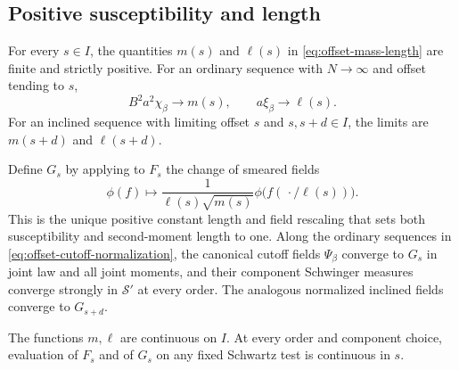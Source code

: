 \subsection{Positive susceptibility and length}

\begin{proposition}
\label{prop:normalization}
For every $s\in I$, the quantities $m(s)$ and $\ell(s)$ in
\eqref{eq:offset-mass-length} are finite and strictly positive.
For an ordinary sequence with $N\to\infty$ and offset tending to $s$,
\begin{equation}
 B^2a^2\chi_\beta\longrightarrow m(s),\qquad
 a\xi_\beta\longrightarrow\ell(s).
 \label{eq:offset-cutoff-normalization}
\end{equation}
For an inclined sequence with limiting offset $s$ and $s,s+d\in I$,
the limits are $m(s+d)$ and $\ell(s+d)$.

Define $G_s$ by applying to $F_s$ the change of smeared fields
\begin{equation}
 \phi(f)\longmapsto\frac{1}{\ell(s)\sqrt{m(s)}}
                     \phi\bigl(f(\,\cdot/\ell(s))\bigr).
 \label{eq:canonical-hierarchy-normalization}
\end{equation}
This is the unique positive constant length and field rescaling that
sets both susceptibility and second-moment length to one.
Along the ordinary sequences in
\eqref{eq:offset-cutoff-normalization}, the canonical cutoff fields
$\Psi_\beta$ converge to $G_s$ in joint law and all joint moments, and
their component Schwinger measures converge strongly in $\mathcal S'$
at every order.  The analogous normalized inclined fields converge to
$G_{s+d}$.

The functions $m,\ell$ are continuous on $I$.  At every order and
component choice, evaluation of $F_s$ and of $G_s$ on any fixed
Schwartz test is continuous in $s$.
\end{proposition}

